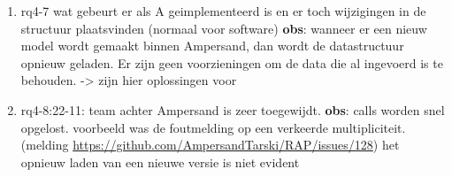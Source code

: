 \begin{enumerate}
    \item rq4-7 wat gebeurt er als A geimplementeerd is en er toch wijzigingen in de structuur plaatsvinden (normaal voor software)
    \newline\textbf{obs}: wanneer er een nieuw model wordt gemaakt binnen Ampersand, dan wordt de datastructuur opnieuw geladen.
    Er zijn geen voorzieningen om de data die al ingevoerd is te behouden.
    -> zijn hier oplossingen voor
    
    \item rq4-8:22-11: team achter Ampersand is zeer toegewijdt. 
    \newline\textbf{obs}: calls worden snel opgelost. 
    voorbeeld was de foutmelding op een verkeerde multipliciteit. 
    (melding \url{https://github.com/AmpersandTarski/RAP/issues/128})
    het opnieuw laden van een nieuwe versie is niet evident
    
    
\end{enumerate}


\newpage
